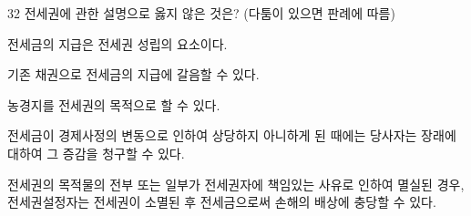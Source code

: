 \begin{question}{32}
전세권에 관한 설명으로 옳지 않은 것은? (다툼이 있으면 판례에 따름)
\begin{choices}
  \item 전세금의 지급은 전세권 성립의 요소이다.
  \item 기존 채권으로 전세금의 지급에 갈음할 수 있다.
  \item 농경지를 전세권의 목적으로 할 수 있다.
  \item 전세금이 경제사정의 변동으로 인하여 상당하지 아니하게 된 때에는 당사자는 장래에 대하여 그 증감을 청구할 수 있다.
  \item 전세권의 목적물의 전부 또는 일부가 전세권자에 책임있는 사유로 인하여 멸실된 경우, 전세권설정자는 전세권이 소멸된 후 전세금으로써 손해의 배상에 충당할 수 있다.
\end{choices}
\end{question}
